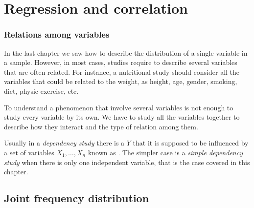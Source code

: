 \section{Regression and correlation}



\begin{frame}
\frametitle{Relations among variables}
In the last chapter we saw how to describe the distribution of a single variable in a sample. 
However, in most cases, studies require to describe several variables that are often related.
For instance, a nutritional study should consider all the variables that could be related to the weight, as height, age,
gender, smoking, diet, physic exercise, etc.

To understand a phenomenon that involve several variables is not enough to study every variable by its own. 
We have to study all the variables together to describe how they interact and the type of relation among them. 

Usually in a \emph{dependency study} there is a  $Y$ that it is supposed to be influenced
by a set of variables $X_1,\ldots,X_n$ known as . 
The simpler case is a \emph{simple dependency study} when there is only one independent variable, that is the case
covered in this chapter. 
\end{frame}


\subsection{Joint frequency distribution}

